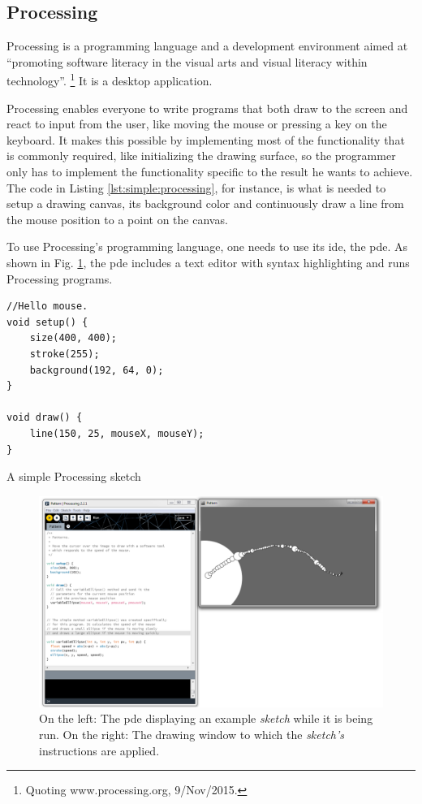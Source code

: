 \subsection{Processing}
\label{section:processing:related}
Processing\cite{reas2007processing} is a programming language and a development environment aimed at ``promoting software literacy in the visual arts and visual literacy within technology''.%
\footnote{Quoting www.processing.org, 9/Nov/2015.}
It is a desktop application.

Processing enables everyone to write programs that both draw to the screen and react to input from the user, like moving the mouse or pressing a key on the keyboard.
It makes this possible by implementing most of the functionality that is commonly required, like initializing the drawing surface, so the programmer only has to implement the functionality specific to the result he wants to achieve.
The code in Listing \ref{lst:simple:processing}, for instance, is what is needed to setup a drawing canvas, its background color and continuously draw a line from the mouse position to a point on the canvas.

To use Processing's programming language, one needs to use its \gls{ide}, the \acrfull{pde}.
As shown in Fig. \ref{fig:proc:dev:env}, the \gls{pde} includes a text editor with syntax highlighting and runs Processing programs.

\begin{listing}
\begin{verbatim}
//Hello mouse.
void setup() {
	size(400, 400);
	stroke(255);
	background(192, 64, 0);
}

void draw() {
	line(150, 25, mouseX, mouseY);
}
\end{verbatim}
	\caption[A simple Processing sketch]{A simple Processing sketch}
	\label{lst:simple:processing}
\end{listing}

\begin{figure}
	\centering
	\includegraphics[width=1.0\textwidth]{images/proc_dev_env}
	\caption{On the left: The \gls{pde} displaying an example \emph{sketch} while it is being run. On the right: The drawing window to which the \emph{sketch's} instructions are applied.}
	\label{fig:proc:dev:env}
\end{figure}

